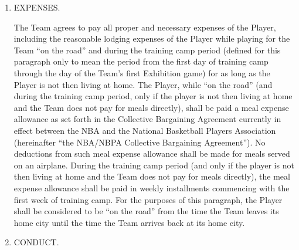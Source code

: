 \documentclass[
]{book}
\begin{document}
\begin{enumerate}
\def\labelenumi{\arabic{enumi}.}
\setcounter{enumi}{3}
\item
  EXPENSES.

  The Team agrees to pay all proper and necessary expenses of the Player, including the reasonable lodging expenses of the Player while playing for the Team ``on the road'' and during the training camp period (defined for this paragraph only to mean the period from the first day of training camp through the day of the Team's first Exhibition game) for as long as the Player is not then living at home. The Player, while ``on the road'' (and during the training camp period, only if the player is not then living at home and the Team does not pay for meals directly), shall be paid a meal expense allowance as set forth in the Collective Bargaining Agreement currently in effect between the NBA and the National Basketball Players Association (hereinafter ``the NBA/NBPA Collective Bargaining Agreement''). No deductions from such meal expense allowance shall be made for meals served on an airplane. During the training camp period (and only if the player is not then living at home and the Team does not pay for meals directly), the meal expense allowance shall be paid in weekly installments commencing with the first week of training camp. For the purposes of this paragraph, the Player shall be considered to be ``on the road'' from the time the Team leaves its home city until the time the Team arrives back at its home city.
\item
  CONDUCT.
\end{enumerate}
\end{document}
